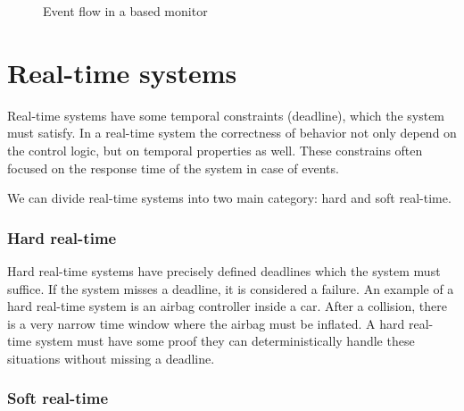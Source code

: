 \begin{figure}
	\centering
	\caption{Event flow in a \cep{} based monitor}
\label{fig:cep_monitoring_event_flow}
\end{figure}

\section{Real-time systems}

Real-time systems have some temporal constraints (deadline), which the system must satisfy. In a real-time system the correctness of behavior not only depend on the control logic, but on temporal properties as well. These constrains often focused on the response time of the system in case of events.

We can divide real-time systems into two main category: hard and soft real-time.

\subsubsection{Hard real-time}

Hard real-time systems have precisely defined deadlines which the system must suffice. If the system misses a deadline, it is considered a failure. An example of a hard real-time system is an airbag controller inside a car. After a collision, there is a very narrow time window where the airbag must be inflated. A hard real-time system must have some proof they can deterministically handle these situations without missing a deadline.

\subsubsection{Soft real-time}

